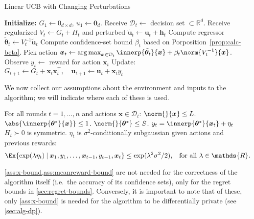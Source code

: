 \documentclass{article}
\renewcommand{\vec}[1]{\bm{#1}}
\newcommand{\inv}[1]{#1^{-1}}
\newcommand{\Real}{\mathds{R}}
\newcommand{\argmax}{\operatorname*{arg\,max}}
\newcommand\given[1][\delimsize]{%
  \providecommand{\delimsize}{}
  \nonscript\:#1\vert\allowbreak\nonscript\:\mathopen{}
}
\DeclarePairedDelimiter{\abs}||
\providecommand\transp{\top}
\let\transpsymbol\transp
\renewcommand{\transp}[1]{#1^\transpsymbol}
\newcommand{\Dset}[1]{\mathcal{D}_{#1}}
\newenvironment{assumptions*}[2][]{%
  \begin{assumptions}[#1]
    #2
    \begin{enumerate}[nosep]
      \setcounter{enumi}{\theassumption}
      \newcommand{\assume}[1][]{\item\label[assumption]{##1}}
    }{
      \setcounter{assumption}{\theenumi}
    \end{enumerate}
  \end{assumptions}%
}
\begin{document}
\begin{algorithm}
  \caption{Linear UCB with Changing Perturbations}\label{alg:linucb}
  \begin{algorithmic}
    \State \textbf{Initialize:} $G_1 \gets 0_{d\times d}$,
    $u_1\gets \vec 0_{d}$.
    \State Receive $\Dset{t} \gets{}$ decision set ${} \subset \Real^d$.
    \State Receive regularized $V_t \gets G_t + H_t$ and perturbed $\tilde{\vec u}_t \gets \vec u_t + \vec h_t$
    \State Compute regressor $\tilde{\vec\theta}_{t} \gets \inv{V_{t}}\tilde{\vec u}_{t}$
    \State Compute confidence-set bound $\beta_t$ based on Porposition~\ref{prop:calc-beta}.
    \State Pick action $\vec x_t \gets \argmax_{\vec x\in\Dset{t}}
    \innerp{\tilde{\vec \theta}_t}{\vec x} +
    \beta_t\norm{\inv{V_t}}{\vec x}$.
    \State Observe $y_t \gets {}$ reward for action $\vec x_t$
    \State Update: $G_{t+1} \gets G_{t} + \vec x_t \transp{\vec x_t},
    \quad \vec u_{t+1} \gets \vec u_{t} + \vec x_t y_t$
    \EndFor
  \end{algorithmic}
\end{algorithm}

We now collect our assumptions about the environment and inputs to the
algorithm; we will indicate where each of these is used.
\begin{assumptions*}{%
    For all rounds $t=1,\dotsc,n$ and actions $\vec x\in\Dset{t}$:}
   $\norm{}{\vec x} \le L$.
  $\abs{\innerp{\vec\theta^*}{\vec x}} \le 1$.
   $\norm{}{\vec\theta^*} \le S$.
  $y_t = \innerp{\vec\theta^*}{\vec x_t} + \eta_t$
   $H_t \succ 0$ is symmetric.
   $\eta_t$ is $\sigma^2$-conditionally
  subgaussian given actions and previous rewards:
  \begin{align*}
    \Ex{\exp(\lambda\eta_t) \given \vec x_1, y_1, \dotsc, \vec x_{t-1}, y_{t-1}, \vec x_t}
    &\le \exp(\lambda^2\sigma^2/2), &\text{for all } \lambda\in\Real.
  \end{align*}
\end{assumptions*}
\cref{ass:x-bound,ass:meanreward-bound} are not needed for the
correctness of the algorithm itself (i.e.\ the accuracy of its
confidence sets), only for the regret bounds in
\cref{sec:regret-bounds}.  Conversely, it is important to note that of
these, only \cref{ass:x-bound} is needed for the algorithm to be
differentially private (see \cref{sec:alg-dp}).
\end{document}
